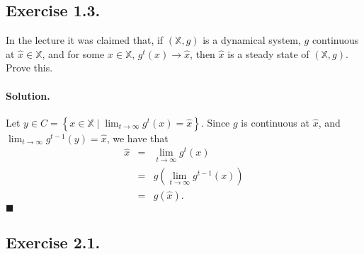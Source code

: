 \documentclass[11pt]{article}
\begin{document}
    \subsection*{Exercise 1.3.}\label{exercise-1.3.}

    In the lecture it was claimed that, if \(\left(\mathbb{X},g\right)\) is
a dynamical system, \(g\) continuous at \(\hat{x}\in\mathbb{X}\), and
for some \(x\in\mathbb{X}\), \(g^{t}(x)\to\hat{x}\), then \(\hat{x}\) is
a steady state of \(\left(\mathbb{X},g\right)\). Prove this.

    \paragraph{Solution.}\label{solution.}

Let
\(y\in C = \left\{ x \in \mathbb{X} \mid \lim_{t\to\infty} g^t (x) = \hat{x} \right\}\).
Since \(g\) is continuous at \(\hat{x}\), and
\(\lim_{t\to\infty} g^{t-1} (y) = \hat{x}\), we have that \[
\begin{eqnarray*}
\hat{x}&=&\lim_{t\to\infty} g^t (x) \\
&=& g\left( \lim_{t\to\infty}g^{t-1}(x)\right) \\
&=&g\left(\hat x\right). 
\end{eqnarray*}
\] \(\blacksquare\)

    \subsection*{Exercise 2.1.}\label{exercise-2.1.}
\end{document}
